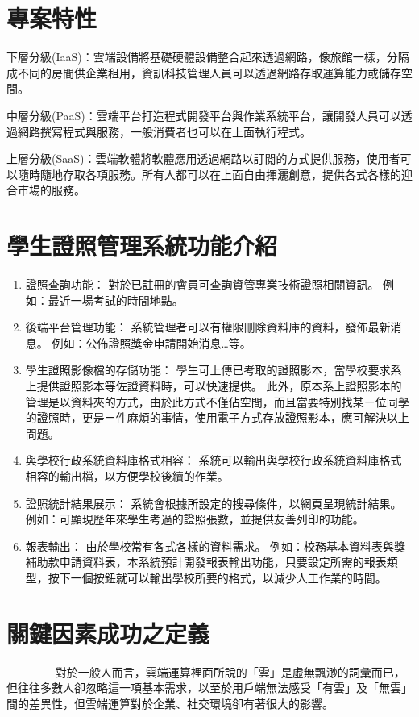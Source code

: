   \section{專案特性}

下層分級(IaaS)：雲端設備將基礎硬體設備整合起來透過網路，像旅館一樣，分隔成不同的房間供企業租用，資訊科技管理人員可以透過網路存取運算能力或儲存空間。

中層分級(PaaS)：雲端平台打造程式開發平台與作業系統平台，讓開發人員可以透過網路撰寫程式與服務，一般消費者也可以在上面執行程式。

上層分級(SaaS)：雲端軟體將軟體應用透過網路以訂閱的方式提供服務，使用者可以隨時隨地存取各項服務。所有人都可以在上面自由揮灑創意，提供各式各樣的迎合市場的服務。

  \section{學生證照管理系統功能介紹}

\begin{enumerate}[noitemsep]
\item 證照查詢功能：
對於已註冊的會員可查詢資管專業技術證照相關資訊。
例如：最近一場考試的時間地點。

\item 後端平台管理功能：
系統管理者可以有權限刪除資料庫的資料，發佈最新消息。
例如：公佈證照獎金申請開始消息…等。

\item 學生證照影像檔的存儲功能：
學生可上傳已考取的證照影本，當學校要求系上提供證照影本等佐證資料時，可以快速提供。
此外，原本系上證照影本的管理是以資料夾的方式，由於此方式不僅佔空間，而且當要特別找某ㄧ位同學的證照時，更是ㄧ件麻煩的事情，使用電子方式存放證照影本，應可解決以上問題。

\item 與學校行政系統資料庫格式相容：
系統可以輸出與學校行政系統資料庫格式相容的輸出檔，以方便學校後續的作業。

\item 證照統計結果展示：
系統會根據所設定的搜尋條件，以網頁呈現統計結果。
例如：可顯現歷年來學生考過的證照張數，並提供友善列印的功能。

\item 報表輸出：
由於學校常有各式各樣的資料需求。
例如：校務基本資料表與獎補助款申請資料表，本系統預計開發報表輸出功能，只要設定所需的報表類型，按下一個按鈕就可以輸出學校所要的格式，以減少人工作業的時間。
\end{enumerate}

  \section{關鍵因素成功之定義}
　　　　
對於一般人而言，雲端運算裡面所說的「雲」是虛無飄渺的詞彙而已，但往往多數人卻忽略這一項基本需求，以至於用戶端無法感受「有雲」及「無雲」間的差異性，但雲端運算對於企業、社交環境卻有著很大的影響。

